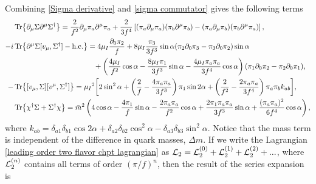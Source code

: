 %
Combining \autoref{Sigma derivative} and \autoref{sigma commutator} gives the following terms
\begin{align}
    & \Tr{\partial_\mu \Sigma \partial^\mu \Sigma^\dagger}
    = \frac{2}{f^2} \partial_\mu \pi_a \partial^\mu \pi_a
    + \frac{2}{3f^4}
    \left[
        (\pi_a\partial_\mu \pi_a)(\pi_b\partial^\mu \pi_b)
        -        
        (\pi_a\partial_\mu \pi_b)(\pi_b\partial^\mu \pi_a)
    \right], \\
    \nonumber
    -i  &\Tr{\partial^\mu\Sigma[v_\mu,\Sigma^\dagger] - \text{h.c.}}
    =
    4 \mu_I \frac{\partial_0\pi_2}{f}
    + 8 \mu_I \frac{\pi_3}{3f^3}\sin{\alpha}(
        \pi_2 \partial_0 \pi_3 - \pi_3 \partial_0 \pi_2
        ) \sin{\alpha}
    \\ & \quad \quad \quad \quad \quad \quad \quad \quad \quad \quad \quad
    +
    \left(
        \frac{4\mu_I}{f^2} \cos{\alpha}
        - \frac{8 \mu_I\pi_1}{3f^3} \sin{\alpha}
        - \frac{4 \mu_I \pi_a \pi_a} {3f^4}\cos{\alpha} 
    \right) 
    (\pi_1\partial_0 \pi_2 - \pi_2 \partial_0 \pi_1), \\
    - & \Tr{[v_\mu,\Sigma][v^\mu,\Sigma^\dagger]}
    = \mu_I{}^2
    \bigg[
        2 \sin^2{\alpha}
        +
        \left(
            \frac{2}{f} 
            - \frac{4\pi_a \pi_a}{3 f^3} 
        \right)
        \pi_1  \sin{2\alpha}
        + \left(
            \frac{2}{f^2}
            - \frac{2 \pi_a \pi_a}{3 f^4} 
        \right)
        \pi_a \pi_b k_{ab}
    \bigg], 
    \\
    & \Tr{\chi^\dagger \Sigma + \Sigma^\dagger\chi}
    = 
    \bar m^2 
    \left(
        4 \cos{\alpha} 
        - \frac{4 \pi_1}{f} \sin{\alpha} 
        - \frac{2 \pi_a \pi_a}{f^2} \cos{\alpha}
        + \frac{2 \pi_1 \pi_a \pi_a}{3 f^3} \sin{\alpha}
        + \frac{(\pi_a \pi_a)^2}{6 f^4}\cos{\alpha}
    \right), 
    \end{align}
where $k_{ab} =\delta_{a1} \delta_{b1} \cos{2\alpha}  + \delta_{a2}\delta_{b2}\cos^2{\alpha} - \delta_{a3}\delta_{b3} \sin^2{\alpha}$.
Notice that the mass term is independent of the difference in quark masses, $\Delta m$.
If we write the Lagrangian \autoref{leading order two flavor chpt lagrangian} as $\mathcal{L}_2 = \mathcal{L}_2^{(0)} + \mathcal{L}_2^{(1)} + \mathcal{L}_2^{(2)} +...$, where $\mathcal{L}_2^{(n)}$ contains all terms of order $(\pi/f)^n$, then the result of the series expansion is
